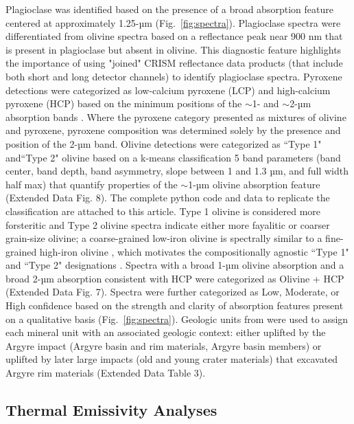 \documentclass[12pt]{article}
\begin{document}
Plagioclase was identified based on the presence of a broad absorption feature centered at approximately 1.25-µm (Fig.~\ref{fig:spectra}). Plagioclase spectra were differentiated from olivine spectra based on a reflectance peak near 900 nm that is present in plagioclase but absent in olivine. This diagnostic feature highlights the importance of using "joined" CRISM reflectance data products (that include both short and long detector channels) to identify plagioclase spectra. Pyroxene detections were categorized as low-calcium pyroxene (LCP) and high-calcium pyroxene (HCP) based on the minimum positions of the $\sim$1- and $\sim$2-µm absorption bands \citep{Viviano2014}. Where the pyroxene category presented as mixtures of olivine and pyroxene, pyroxene composition was determined solely by the presence and position of the 2-µm band. Olivine detections were categorized as ``Type 1" and``Type 2" olivine \citep{Ody2013} based on a k-means classification 5 band parameters (band center, band depth, band asymmetry, slope between 1 and 1.3 µm, and full width half max) that quantify properties of the $\sim$1-µm olivine absorption feature (Extended Data Fig. 8). The complete python code and data to replicate the classification are attached to this article. Type 1 olivine is considered more forsteritic and Type 2 olivine spectra indicate either more fayalitic or coarser grain-size olivine; a coarse-grained low-iron olivine is spectrally similar to a fine-grained high-iron olivine \citep[e.g.,][]{Mustard2005}, which motivates the compositionally agnostic ``Type 1" and ``Type 2" designations \citep{Ody2013}. Spectra with a broad 1-µm olivine absorption and a broad 2-µm absorption consistent with HCP were categorized as Olivine + HCP (Extended Data Fig. 7). Spectra were further categorized as Low, Moderate, or High confidence based on the strength and clarity of absorption features present on a qualitative basis (Fig.~\ref{fig:spectra}). Geologic units from \citet{Dohm2015} were used to assign each mineral unit with an associated geologic context: either uplifted by the Argyre impact (Argyre basin and rim materials, Argyre basin members) or uplifted by later large impacts (old and young crater materials) that excavated Argyre rim materials (Extended Data Table 3).

\subsection*{Thermal Emissivity Analyses}
\end{document}
